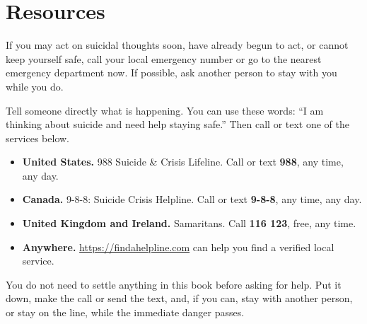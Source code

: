 \chapter*{Resources}\label{resources}

If you may act on suicidal thoughts soon, have already begun to act, or cannot keep yourself safe, call your local emergency number or go to the nearest emergency department now. If possible, ask another person to stay with you while you do.

Tell someone directly what is happening. You can use these words: ``I am thinking about suicide and need help staying safe.'' Then call or text one of the services below.

\begin{itemize}
\setlength{\itemsep}{0.6em}
\item \textbf{United States.} 988 Suicide \& Crisis Lifeline. Call or text \textbf{988}, any time, any day.
\item \textbf{Canada.} 9-8-8: Suicide Crisis Helpline. Call or text \textbf{9-8-8}, any time, any day.
\item \textbf{United Kingdom and Ireland.} Samaritans. Call \textbf{116 123}, free, any time.
\item \textbf{Anywhere.} \url{https://findahelpline.com} can help you find a verified local service.
\end{itemize}

\bigskip

\noindent You do not need to settle anything in this book before asking for help. Put it down, make the call or send the text, and, if you can, stay with another person, or stay on the line, while the immediate danger passes.
